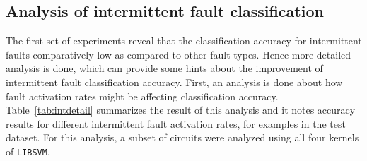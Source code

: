 \subsection{Analysis of intermittent fault classification}
\label{sec:wp:intanalysis}
The first set of experiments reveal that the classification accuracy for intermittent faults comparatively low as compared to other fault types. Hence more detailed analysis is done, which can provide some hints about the improvement of intermittent fault classification accuracy. First, an analysis is done about how fault activation rates might be affecting classification accuracy. Table~\ref{tab:intdetail} summarizes the result of this analysis and it notes accuracy results for different intermittent fault activation rates, for examples in the test dataset. For this analysis, a subset of circuits were analyzed using all four kernels of \texttt{LIBSVM}.


